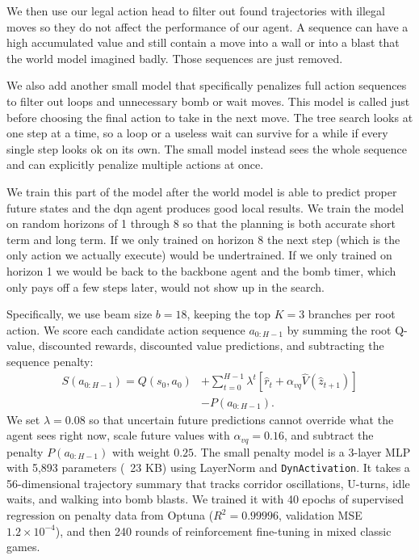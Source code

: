 \documentclass[article, 10pt]{IEEEtran}
\begin{document}
We then use our legal action head to filter out found trajectories with illegal moves so they do not affect the performance of our agent. A sequence can have a high accumulated value and still contain a move into a wall or into a blast that the world model imagined badly. Those sequences are just removed.

We also add another small model that specifically penalizes full action sequences to filter out loops and unnecessary bomb or wait moves. This model is called just before choosing the final action to take in the next move. The tree search looks at one step at a time, so a loop or a useless wait can survive for a while if every single step looks ok on its own. The small model instead sees the whole sequence and can explicitly penalize multiple actions at once. 

We train this part of the model after the world model is able to predict proper future states and the dqn agent produces good local results. We train the model on random horizons of 1 through 8 so that the planning is both accurate short term and long term. If we only trained on horizon 8 the next step (which is the only action we actually execute) would be undertrained. If we only trained on horizon 1 we would be back to the backbone agent and the bomb timer, which only pays off a few steps later, would not show up in the search.

Specifically, we use beam size $b=18$, keeping the top $K=3$ branches per root action. We score each candidate action sequence $a_{0:H-1}$ by summing the root Q-value, discounted rewards, discounted value predictions, and subtracting the sequence penalty:
\begin{equation}
\begin{aligned}
S(a_{0:H-1}) = Q(s_0, a_0) &+ \sum_{t=0}^{H-1} \lambda^t \left[\hat{r}_t + \alpha_{vq} \hat{V}(\hat{z}_{t+1})\right] \\
&- P(a_{0:H-1}).
\end{aligned}
\end{equation}
We set $\lambda = 0.08$ so that uncertain future predictions cannot override what the agent sees right now, scale future values with $\alpha_{vq} = 0.16$, and subtract the penalty $P(a_{0:H-1})$ with weight $0.25$. The small penalty model is a 3-layer MLP with 5,893 parameters (~23 KB) using LayerNorm and \texttt{DynActivation}. It takes a 56-dimensional trajectory summary that tracks corridor oscillations, U-turns, idle waits, and walking into bomb blasts. We trained it with 40 epochs of supervised regression on penalty data from Optuna ($R^2 = 0.99996$, validation MSE $1.2 \times 10^{-4}$), and then 240 rounds of reinforcement fine-tuning in mixed classic games.
\end{document}
